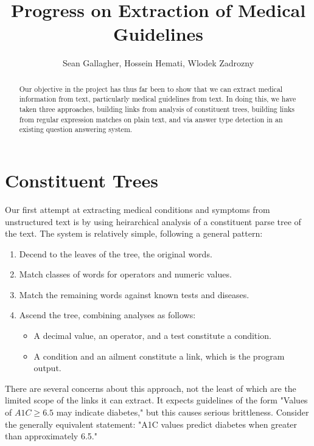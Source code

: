 \documentclass[12pt,letterpaper]{article}
\author{Sean Gallagher, Hossein Hemati, Wlodek Zadrozny}
\title{Progress on Extraction of Medical Guidelines}
\begin{document}
\maketitle
\begin{abstract}
Our objective in the project has thus far been to show that we can extract medical information from text, particularly medical guidelines from text. In doing this, we have taken three approaches, building links from analysis of constituent trees, building links from regular expression matches on plain text, and via answer type detection in an existing question answering system.
\end{abstract}
\section{Constituent Trees}
Our first attempt at extracting medical conditions and symptoms from unstructured text is by using heirarchical analysis of a constituent parse tree of the text. The system is relatively simple, following a general pattern:

\begin{enumerate}
\item Decend to the leaves of the tree, the original words.
\item Match classes of words for operators and numeric values.
\item Match the remaining words against known tests and diseases.
\item Ascend the tree, combining analyses as follows:
\begin{itemize}
	\item A decimal value, an operator, and a test constitute a condition.
	\item A condition and an ailment constitute a link, which is the program output.
\end{itemize}
\end{enumerate}

There are several concerns about this approach, not the least of which are the limited scope of the links it can extract. It expects guidelines of the form
"Values of $A1C \geq 6.5$ may indicate diabetes," but this causes serious brittleness. Consider the generally equivalent statement: "A1C values predict diabetes when greater than approximately 6.5."
\end{document}

